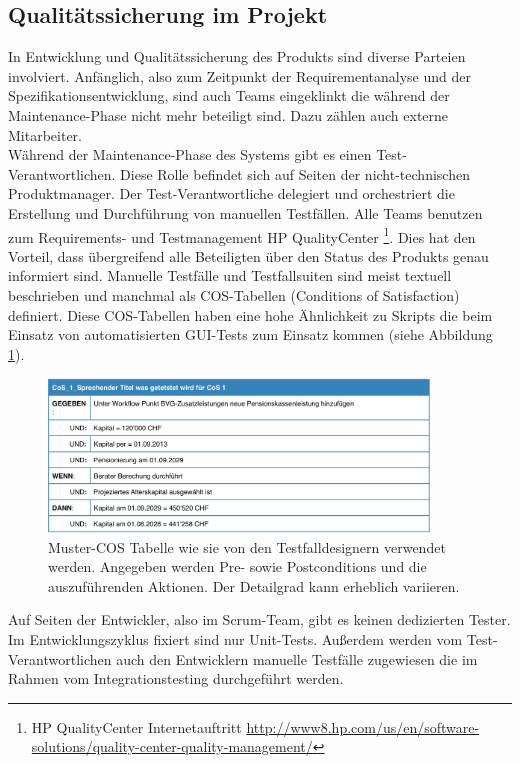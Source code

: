 \subsection{Qualitätssicherung im Projekt}
In Entwicklung und Qualitätssicherung des Produkts sind diverse Parteien involviert. Anfänglich, also zum Zeitpunkt der Requirementanalyse und der Spezifikationsentwicklung, sind auch Teams eingeklinkt die während der Maintenance-Phase nicht mehr beteiligt sind. Dazu zählen auch externe Mitarbeiter.\\
Während der Maintenance-Phase des Systems gibt es einen Test-Verantwortlichen. Diese Rolle befindet sich auf Seiten der nicht-technischen Produktmanager. Der Test-Verantwortliche delegiert und orchestriert die Erstellung und Durchführung von manuellen Testfällen. Alle Teams benutzen zum Requirements- und Testmanagement HP QualityCenter \footnote{HP QualityCenter Internetauftritt \url{http://www8.hp.com/us/en/software-solutions/quality-center-quality-management/}}. Dies hat den Vorteil, dass übergreifend alle Beteiligten über den Status des Produkts genau informiert sind. Manuelle Testfälle und Testfallsuiten sind meist textuell beschrieben und manchmal als COS-Tabellen (Conditions of Satisfaction) definiert. Diese COS-Tabellen haben eine hohe Ähnlichkeit zu Skripts die beim Einsatz von automatisierten GUI-Tests zum Einsatz kommen (siehe Abbildung \ref{fig:cos_raiffeisen}).

\begin{figure}[h] 
  \centering
     \includegraphics[width=0.9\textwidth]{figures/cos_raiffeisen.png}
  \caption{Muster-COS Tabelle wie sie von den Testfalldesignern verwendet werden.  Angegeben werden Pre- sowie Postconditions und die auszuführenden Aktionen. Der Detailgrad kann erheblich variieren.}
  \label{fig:cos_raiffeisen}
\end{figure}


Auf Seiten der Entwickler, also im Scrum-Team, gibt es keinen dedizierten Tester. Im Entwicklungszyklus fixiert sind nur Unit-Tests. Außerdem werden vom Test-Verantwortlichen auch den Entwicklern manuelle Testfälle zugewiesen die im Rahmen vom Integrationstesting durchgeführt werden.

